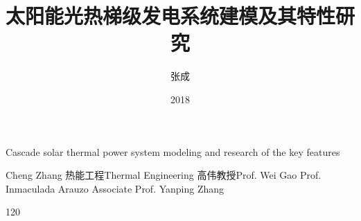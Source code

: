 \makenomenclature

\title{太阳能光热梯级发电系统建模及其特性研究}{Cascade solar thermal power system modeling and research of the key features}
\author
{张成}{Cheng Zhang}
\major
{热能工程}{Thermal Engineering}
\supervisor
{高伟\hspace{0.2em}教授}{Prof. Wei Gao \newline Prof. Inmaculada Arauzo \newline Associate Prof. Yanping Zhang}
\date{2018}{1}{20}